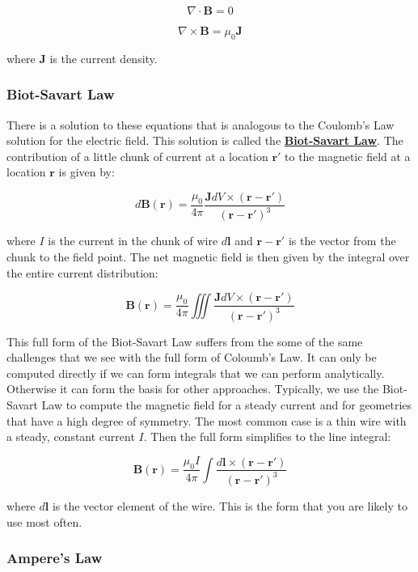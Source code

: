 \[\nabla \cdot \mathbf{B} = 0\]

\[\nabla \times \mathbf{B} = \mu_0 \mathbf{J}\]

where \(\mathbf{J}\) is the current density.

\subsubsection{Biot-Savart Law}\label{biot-savart-law}

There is a solution to these equations that is analogous to the
Coulomb's Law solution for the electric field. This solution is called
the
\textbf{\href{https://en.wikipedia.org/wiki/Biot\%E2\%80\%93Savart_law}{Biot-Savart
Law}}. The contribution of a little chunk of current at a location
\(\mathbf{r}'\) to the magnetic field at a location \(\mathbf{r}\) is
given by:

\[d\mathbf{B}(\mathbf{r}) = \frac{\mu_0}{4\pi} \frac{\mathbf{J} dV \times (\mathbf{r}-\mathbf{r}')}{(\mathbf{r}-\mathbf{r}')^3}\]

where \(I\) is the current in the chunk of wire \(d\mathbf{l}\) and
\(\mathbf{r}-\mathbf{r}'\) is the vector from the chunk to the field
point. The net magnetic field is then given by the integral over the
entire current distribution:

\[\mathbf{B}(\mathbf{r}) = \frac{\mu_0}{4\pi} \iiint \frac{\mathbf{J} dV \times (\mathbf{r}-\mathbf{r}')}{(\mathbf{r}-\mathbf{r}')^3}\]

This full form of the Biot-Savart Law suffers from the some of the same
challenges that we see with the full form of Coloumb's Law. It can only
be computed directly if we can form integrals that we can perform
analytically. Otherwise it can form the basis for other approaches.
Typically, we use the Biot-Savart Law to compute the magnetic field for
a steady current and for geometries that have a high degree of symmetry.
The most common case is a thin wire with a steady, constant current
\(I\). Then the full form simplifies to the line integral:

\[\mathbf{B}(\mathbf{r}) = \frac{\mu_0 I}{4\pi} \int \frac{d\mathbf{l} \times (\mathbf{r}-\mathbf{r}')}{(\mathbf{r}-\mathbf{r}')^3}\]

where \(d\mathbf{l}\) is the vector element of the wire. This is the
form that you are likely to use most often.

\subsubsection{Ampere's Law}\label{amperes-law}


